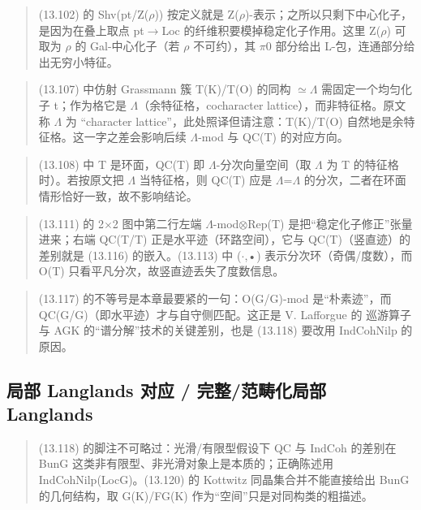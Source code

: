 \begin{quote}\small
(13.102) 的 Shv(pt/Z($\rho$)) 按定义就是 Z($\rho$)-表示；之所以只剩下中心化子，是因为在叠上取点 pt$\to$Loc 的纤维积要模掉稳定化子作用。这里 Z($\rho$) 可取为 $\rho$ 的 Gal-中心化子（若 $\rho$ 不可约），其 $\pi$0 部分给出 L-包，连通部分给出无穷小特征。
\end{quote}

\begin{quote}\small
(13.107) 中仿射 Grassmann 簇 T(K)/T(O) 的同构 $\simeq$$\Lambda$ 需固定一个均匀化子 t；作为格它是 $\Lambda$（余特征格，cocharacter lattice），而非特征格。原文称 $\Lambda$ 为 “character lattice”，此处照译但请注意：T(K)/T(O) 自然地是余特征格。这一字之差会影响后续 $\Lambda$-mod 与 QC(T) 的对应方向。
\end{quote}

\begin{quote}\small
(13.108) 中 T 是环面，QC(T) 即 $\Lambda$-分次向量空间（取 $\Lambda$ 为 T 的特征格时）。若按原文把 $\Lambda$ 当特征格，则 QC(T) 应是 $\Lambda$=$\Lambda$ 的分次，二者在环面情形恰好一致，故不影响结论。
\end{quote}

\begin{quote}\small
(13.111) 的 2$\times$2 图中第二行左端 $\Lambda$-mod$\otimes$Rep(T) 是把“稳定化子修正”张量进来；右端 QC(T/T) 正是水平迹（环路空间），它与 QC(T)（竖直迹）的差别就是 (13.116) 的嵌入。(13.113) 中 ($\cdot$,•) 表示分次环（奇偶/度数），而 O(T) 只看平凡分次，故竖直迹丢失了度数信息。
\end{quote}

\begin{quote}\small
(13.117) 的不等号是本章最要紧的一句：O(G/G)-mod 是“朴素迹”，而 QC(G/G)（即水平迹）才与自守侧匹配。这正是 V. Lafforgue 的 巡游算子与 AGK 的“谱分解”技术的关键差别，也是 (13.118) 要改用 IndCohNilp 的原因。
\end{quote}

\subsection*{局部 Langlands 对应 / 完整/范畴化局部 Langlands}
\begin{quote}\small
(13.118) 的脚注不可略过：光滑/有限型假设下 QC 与 IndCoh 的差别在 BunG 这类非有限型、非光滑对象上是本质的；正确陈述用 IndCohNilp(LocG)。(13.120) 的 Kottwitz 同晶集合并不能直接给出 BunG 的几何结构，取 G(K)/FG(K) 作为“空间”只是对同构类的粗描述。
\end{quote}


